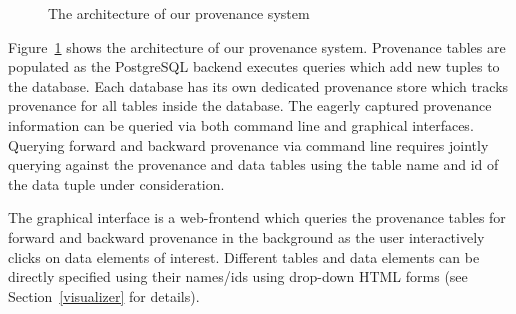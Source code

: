 \begin{figure}

\caption{The architecture of our provenance system}
\label{fig:provarch}
\end{figure}

Figure~\ref{fig:provarch} shows the architecture of our provenance system. Provenance tables are populated as the PostgreSQL backend executes queries which add new tuples to the database. Each database has its own dedicated provenance store which tracks provenance for all tables inside the database. The eagerly captured provenance information can be queried via both command line and graphical interfaces. Querying forward and backward provenance via command line requires jointly querying against the provenance and data tables using the table name and id of the data tuple under consideration. 

The graphical interface is a web-frontend which queries the provenance tables for forward and backward provenance in the background as the user interactively clicks on data elements of interest. Different tables and data elements can be directly specified using their names/ids using drop-down HTML forms (see Section~\ref{visualizer} for details). 